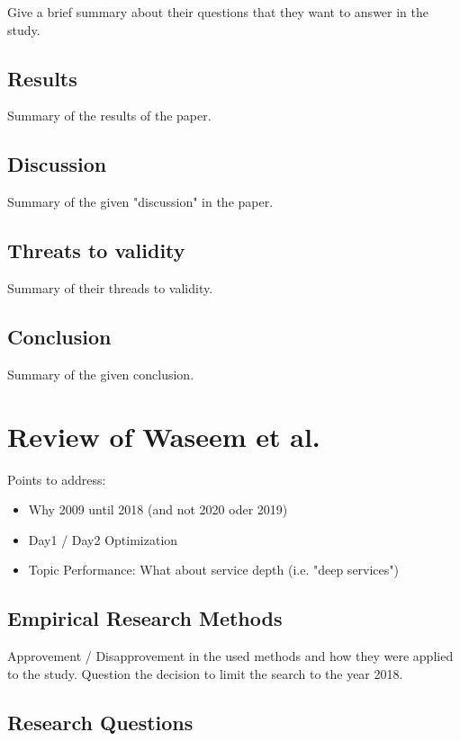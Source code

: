 Give a brief summary about their questions that they want to answer in the study.

\subsection{Results}

Summary of the results of the paper.

\subsection{Discussion}

Summary of the given "discussion" in the paper.

\subsection{Threats to validity}

Summary of their threads to validity.

\subsection{Conclusion}

Summary of the given conclusion.

\section{Review of Waseem et al.}

Points to address:
\begin{itemize}
    \item Why 2009 until 2018 (and not 2020 oder 2019)
    \item Day1 / Day2 Optimization
    \item Topic Performance: What about service depth (i.e. "deep services")
\end{itemize}

\subsection{Empirical Research Methods}

Approvement / Disapprovement in the used methods and how they were applied to
the study. Question the decision to limit the search to the year 2018.

\subsection{Research Questions}

